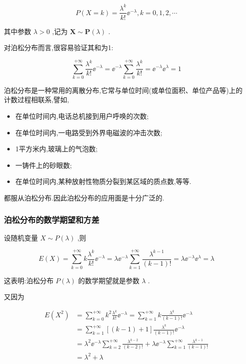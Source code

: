 \begin{equation}
P(X=k)=\frac{\lambda^{k}}{k !} \ee ^{-\lambda}, k=0,1,2, \cdots \label{eq:2.4.3}
\end{equation}

其中参数 $ \lambda >0 $ ,记为 $ \mathbf{X} \sim \mathbf{P}(\lambda) $ .

对泊松分布而言,很容易验证其和为1:

\[
\sum_{k=0}^{+\infty} \frac{\lambda^{k}}{k !} \ee ^{-\lambda}=\ee ^{-\lambda} \sum_{k=0}^{+\infty} \frac{\lambda^{k}}{k !}=\ee ^{-\lambda} \ee ^{\lambda}=1
\]

泊松分布是一种常用的离散分布,它常与单位时间(或单位面积、单位产品等)上的计数过程相联系,譬如,

\begin{itemize}
	\item 在单位时间内,电话总机接到用户呼唤的次数;
	\item 在单位时间内,一电路受到外界电磁波的冲击次数;
	\item 1平方米内,玻璃上的气泡数;
	\item 一铸件上的砂眼数;
	\item 在单位时间内,某种放射性物质分裂到某区域的质点数,等等.
\end{itemize}

都服从泊松分布.因此泊松分布的应用面是十分广泛的.

\subsubsection{泊松分布的数学期望和方差}

设随机变量 $ X \sim P(\lambda) $ ,则

\[
E(X)=\sum_{k=0}^{+\infty} k \frac{\lambda^{k}}{k !} \ee ^{-\lambda}=\lambda \ee ^{-\lambda} \sum_{k=1}^{+\infty} \frac{\lambda^{k-1}}{(k-1) !}=\lambda \ee ^{-\lambda} \ee ^{\lambda}=\lambda
\]

这表明:泊松分布 $ P(\lambda) $ 的数学期望就是参数 $ \lambda $ .

又因为

\[
\begin{aligned} E\left(X^{2}\right) &=\sum_{k=0}^{+\infty} k^{2} \frac{\lambda^{k}}{k !} \ee ^{-\lambda}=\sum_{k=1}^{+\infty} k \frac{\lambda^{k}}{(k-1) !} \ee ^{-\lambda} \\ &=\sum_{k=1}^{+\infty}[(k-1)+1] \frac{\lambda^{k}}{(k-1) !} \ee ^{-\lambda} \\ &=\lambda^{2} \ee ^{-\lambda} \sum_{k=2}^{+\infty} \frac{\lambda^{k-2}}{(k-2) !}+\lambda \ee ^{-\lambda} \sum_{k=1}^{+\infty} \frac{\lambda^{k-1}}{(k-1) !} \\ &=\lambda^{2}+\lambda \end{aligned}
\]

